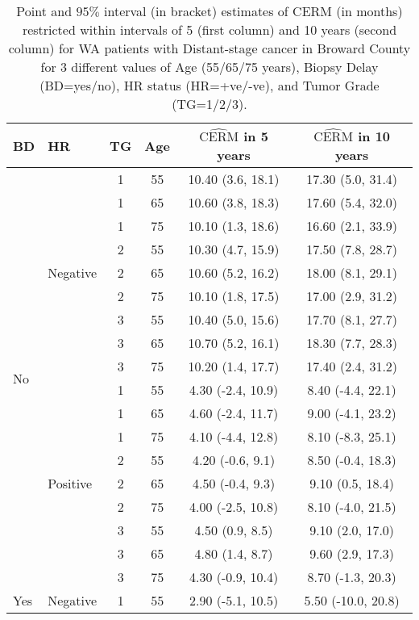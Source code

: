 \documentclass[aoas]{imsart}
\theoremstyle{plain}
\theoremstyle{definition}
\begin{document}
\begin{table}[htbp]
\centering
\small
\caption{Point and $95\%$ interval (in bracket) estimates  of ${\text{CERM}}$ (in months)  restricted within intervals of 5 (first column) and 10 years (second column)   for WA patients with Distant-stage cancer in Broward County for 3 different values  of Age (55/65/75 years), Biopsy Delay (BD=yes/no), HR status (HR=+ve/-ve), and Tumor Grade (TG=1/2/3).}
\label{tab:cate_CERM_big_county_names}
\begin{tabular}{l|l|cccc}
\hline
BD & HR & TG & Age & $\widehat{\text{CERM}}$  in 5 years& $\widehat{\text{CERM}}$ in 10 years\\
\hline
\multirow{18}{*}{No} & \multirow{9}{*}{Negative} & 1 & 55 & 10.40 (3.6, 18.1) & 17.30 (5.0, 31.4) \\
 &  & 1 & 65 & 10.60 (3.8, 18.3) & 17.60 (5.4, 32.0) \\
 &  & 1 & 75 & 10.10 (1.3, 18.6) & 16.60 (2.1, 33.9) \\
 &  & 2 & 55 & 10.30 (4.7, 15.9) & 17.50 (7.8, 28.7) \\
 &  & 2 & 65 & 10.60 (5.2, 16.2) & 18.00 (8.1, 29.1) \\
 &  & 2 & 75 & 10.10 (1.8, 17.5) & 17.00 (2.9, 31.2) \\
 &  & 3 & 55 & 10.40 (5.0, 15.6) & 17.70 (8.1, 27.7) \\
 &  & 3 & 65 & 10.70 (5.2, 16.1) & 18.30 (7.7, 28.3) \\
 &  & 3 & 75 & 10.20 (1.4, 17.7) & 17.40 (2.4, 31.2) \\
\cline{2-6}
 & \multirow{9}{*}{Positive} & 1 & 55 & 4.30 (-2.4, 10.9) & 8.40 (-4.4, 22.1) \\
 &  & 1 & 65 & 4.60 (-2.4, 11.7) & 9.00 (-4.1, 23.2) \\
 &  & 1 & 75 & 4.10 (-4.4, 12.8) & 8.10 (-8.3, 25.1) \\
 &  & 2 & 55 & 4.20 (-0.6, 9.1) & 8.50 (-0.4, 18.3) \\
 &  & 2 & 65 & 4.50 (-0.4, 9.3) & 9.10 (0.5, 18.4) \\
 &  & 2 & 75 & 4.00 (-2.5, 10.8) & 8.10 (-4.0, 21.5) \\
 &  & 3 & 55 & 4.50 (0.9, 8.5) & 9.10 (2.0, 17.0) \\
 &  & 3 & 65 & 4.80 (1.4, 8.7) & 9.60 (2.9, 17.3) \\
 &  & 3 & 75 & 4.30 (-0.9, 10.4) & 8.70 (-1.3, 20.3) \\
\hline
\multirow{18}{*}{Yes} & \multirow{9}{*}{Negative} & 1 & 55 & 2.90 (-5.1, 10.5) & 5.50 (-10.0, 20.8) \\

\end{tabular}
\end{table}
\end{document}

